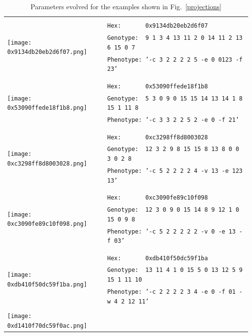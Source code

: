 \documentclass{article}
\begin{document}
\begin{center}
	\begin{table}[h!!t]
	\caption{Parameters evolved for the examples shown in Fig.~\ref{projections}}
	\begin{tabular}{|l|l|}
		\hline
		\multirow{5}{*}{\texttt{[image: 0x9134db20eb2d6f07.png]}}
		& \\
		& \texttt{Hex:\ \ \ \ \ \ \ 0x9134db20eb2d6f07}\\
		& \texttt{Genotype:\ \ 9 1 3 4 13 11 2 0 14 11 2 13 6 15 0 7}\\
		& \texttt{Phenotype:\ '-c 3 2 2 2 2 5  -e 0 0123 -f 23'}\\
		& \\
		\hline
		\multirow{5}{*}{\texttt{[image: 0x53090ffede18f1b8.png]}}
		& \\
		& \texttt{Hex:\ \ \ \ \ \ \ 0x53090ffede18f1b8}\\
		& \texttt{Genotype:\ \ 5 3 0 9 0 15 15 14 13 14 1 8 15 1 11 8}\\
		& \texttt{Phenotype:\ '-c 3 3 2 2 5 2  -e 0 -f 21'}\\
		& \\
		\hline
		\multirow{5}{*}{\texttt{[image: 0xc3298ff8d8003028.png]}}
		& \\
		& \texttt{Hex:\ \ \ \ \ \ \ 0xc3298ff8d8003028}\\
		& \texttt{Genotype:\ \ 12 3 2 9 8 15 15 8 13 8 0 0 3 0 2 8}\\
		& \texttt{Phenotype:\ '-c 5 2 2 2 2 4 -v 13 -e 123 13'}\\
		& \\
		\hline
		\multirow{5}{*}{\texttt{[image: 0xc3090fe89c10f098.png]}}
		& \\
		& \texttt{Hex:\ \ \ \ \ \ \ 0xc3090fe89c10f098}\\
		& \texttt{Genotype:\ \ 12 3 0 9 0 15 14 8 9 12 1 0 15 0 9 8}\\
		& \texttt{Phenotype:\ '-c 5 2 2 2 2 2 -v 0 -e 13 -f 03'}\\
		& \\
		\hline
		\multirow{5}{*}{\texttt{[image: 0xdb410f50dc59f1ba.png]}}
		& \\
		& \texttt{Hex:\ \ \ \ \ \ \ 0xdb410f50dc59f1ba}\\
		& \texttt{Genotype:\ \ 13 11 4 1 0 15 5 0 13 12 5 9 15 1 11 10}\\
		& \texttt{Phenotype:\ '-c 2 2 2 2 3 4  -e 0 -f 01 -w 4 2 12 11'}\\
		& \\
		\hline
		\multirow{5}{*}{\texttt{[image: 0xd1410f70dc59f0ac.png]}}

\end{tabular}
\end{table}
\end{center}
\end{document}
